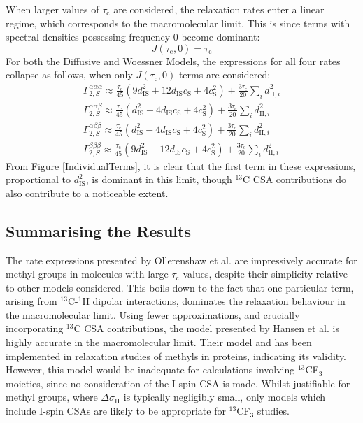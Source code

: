 When larger values of $\tau_{\text{c}}$ are considered, the relaxation rates enter a linear regime, which corresponds to the macromolecular limit. This is since terms with spectral densities possessing frequency $0$ become dominant:
\begin{equation}
J(\tau_{\text{c}}, 0) = \tau_{\text{c}}
\end{equation}
For both the Diffusive and Woessner Models, the expressions for all four rates
collapse as follows, when only $J(\tau_{\text{c}}, 0)$ terms are considered:
\begin{equation}\label{MacroLim}
\begin{gathered}
\Gamma_{2,S}^{\alpha\alpha\alpha} \approx \frac{\tau_{\text{c}}}{45} \left( 9 d_{\text{IS}}^2  + 12 d_{\text{IS}} c_{\text{S}} + 4 c_{\text{S}}^2 \right) + \frac{3 \tau_{\text{c}} }{20} \sum \limits_i d_{\text{II},i}^2\\
\Gamma_{2,S}^{\alpha\alpha\beta} \approx \frac{\tau_{\text{c}}}{45} \left(d_{\text{IS}}^2  + 4 d_{\text{IS}} c_{\text{S}} + 4 c_{\text{S}}^2 \right) + \frac{3 \tau_{\text{c}}}{20} \sum \limits_i d_{\text{II},i}^2 \\
\Gamma_{2,S}^{\alpha\beta\beta} \approx \frac{\tau_{\text{c}}}{45} \left(d_{\text{IS}}^2  - 4 d_{\text{IS}} c_{\text{S}} + 4 c_{\text{S}}^2 \right) + \frac{3 \tau_{\text{c}} }{20} \sum \limits_i d_{\text{II},i}^2 \\
\Gamma_{2,S}^{\beta\beta\beta} \approx \frac{\tau_{\text{c}}}{45} \left(9 d_{\text{IS}}^2  - 12 d_{\text{IS}} c_{\text{S}} + 4 c_{\text{S}}^2 \right) + \frac{3 \tau_{\text{c}}}{20} \sum \limits_i d_{\text{II},i}^2
\end{gathered}
\end{equation}
From Figure \ref{IndividualTerms}, it is clear that the first term in these expressions, proportional to $d_{\text{IS}}^2$, is dominant in this limit, though $^{13}$C CSA contributions do also contribute to a noticeable extent.
\subsection{Summarising the Results}
The rate expressions presented by Ollerenshaw et al. are impressively accurate for methyl groups in molecules with large $\tau_{\text{c}}$ values, despite their simplicity relative to other models considered. This boils down to the fact that one particular term, arising from $^{13}$C-$^1$H dipolar interactions, dominates the relaxation behaviour in the macromolecular limit. Using fewer approximations, and crucially incorporating $^{13}$C CSA contributions, the model presented by Hansen et al. is highly accurate in the macromolecular limit. Their model and has been implemented in relaxation studies of methyls in proteins\cite{RN4}, indicating its validity. However, this model would be inadequate for calculations involving $^{13}$CF$_3$ moieties, since no consideration of the I-spin CSA is made. Whilst justifiable for methyl groups, where $\Delta \sigma_{\text{H}}$ is typically negligibly small, only models which include I-spin CSAs are likely to be appropriate for $^{13}$CF$_3$ studies.
